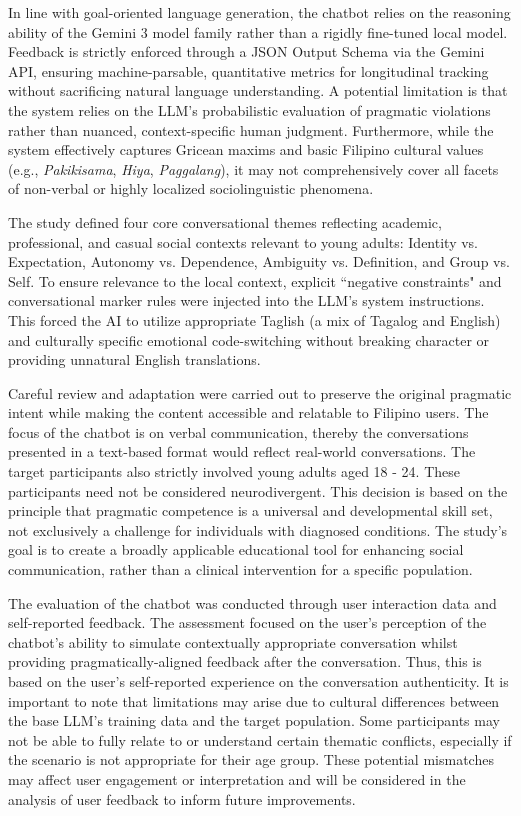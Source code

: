 In line with goal-oriented language generation, the chatbot relies on the reasoning ability of the Gemini 3 model family rather than a rigidly fine-tuned local model. 
Feedback is strictly enforced through a JSON Output Schema via the Gemini API, ensuring machine-parsable, quantitative metrics for longitudinal tracking without sacrificing 
natural language understanding. A potential limitation is that the system relies on the LLM's probabilistic evaluation of pragmatic violations rather than nuanced, 
context-specific human judgment. Furthermore, while the system effectively captures Gricean maxims and basic Filipino cultural values 
(e.g., \textit{Pakikisama}, \textit{Hiya}, \textit{Paggalang}), it may not comprehensively cover all facets of non-verbal or highly localized sociolinguistic phenomena.

The study defined four core conversational themes reflecting academic, professional, and casual social contexts relevant to young adults: Identity vs. Expectation, 
Autonomy vs. Dependence, Ambiguity vs. Definition, and Group vs. Self. To ensure relevance to the local context, explicit ``negative constraints" and conversational 
marker rules were injected into the LLM's system instructions. This forced the AI to utilize appropriate Taglish (a mix of Tagalog and English) and culturally 
specific emotional code-switching without breaking character or providing unnatural English translations.

Careful review and adaptation were carried out to preserve the original pragmatic intent while making the content accessible and 
relatable to Filipino users. The focus of the chatbot is on verbal communication, thereby the conversations presented in a text-based format would reflect real-world 
conversations. The target participants also strictly involved young adults aged 18 - 24. These participants need not be considered neurodivergent. 
This decision is based on the principle that pragmatic competence is a universal and developmental skill set, not exclusively a challenge for individuals with diagnosed 
conditions. The study’s goal is to create a broadly applicable educational tool for enhancing social communication, rather than a clinical intervention for a specific population.

The evaluation of the chatbot was conducted through user interaction data and self-reported feedback. The assessment focused on the user's perception of the chatbot's 
ability to simulate contextually appropriate conversation whilst providing pragmatically-aligned feedback after the conversation. 
Thus, this is based on the user's self-reported experience on the conversation authenticity. It is important to note that limitations may arise due to 
cultural differences between the base LLM's training data and the target population. Some participants may not be able to fully relate to 
or understand certain thematic conflicts, especially if the scenario is not appropriate for their age group. These potential mismatches 
may affect user engagement or interpretation and will be considered in the analysis of user feedback to inform future improvements.

